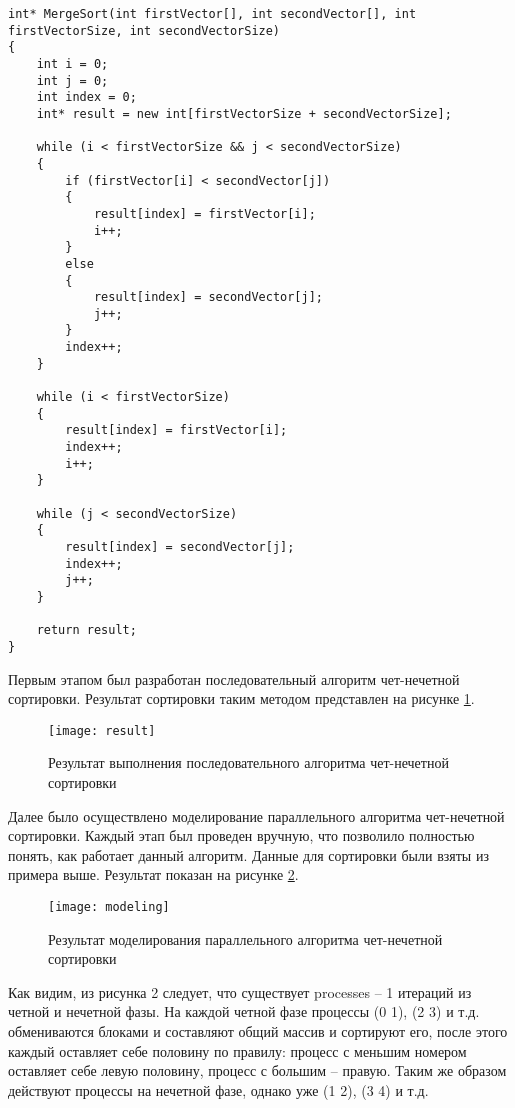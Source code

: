 \documentclass[a4paper,14pt]{extarticle}
\begin{document}
\begin{lstlisting}
int* MergeSort(int firstVector[], int secondVector[], int firstVectorSize, int secondVectorSize)
{
    int i = 0;
    int j = 0;
    int index = 0;
    int* result = new int[firstVectorSize + secondVectorSize];

    while (i < firstVectorSize && j < secondVectorSize) 
    {
        if (firstVector[i] < secondVector[j]) 
        {
            result[index] = firstVector[i];
            i++;
        }
        else 
        {
            result[index] = secondVector[j];
            j++;
        }
        index++;
    }

    while (i < firstVectorSize) 
    {
        result[index] = firstVector[i];
        index++;
        i++;
    }

    while (j < secondVectorSize) 
    {
        result[index] = secondVector[j];
        index++;
        j++;
    }

    return result;
}
\end{lstlisting}

Первым этапом был разработан последовательный алгоритм чет-нечетной сортировки.
Результат сортировки таким методом представлен на рисунке \ref{fig:result}.
\begin{figure}[H]
    \centering
    \texttt{[image: result]}
    \caption{Результат выполнения последовательного алгоритма чет-нечетной сортировки}
    \label{fig:result}
\end{figure}

Далее было осуществлено моделирование параллельного алгоритма чет-нечетной
сортировки. Каждый этап был проведен вручную, что позволило полностью понять,
как работает данный алгоритм. Данные для сортировки были взяты из примера выше.
Результат показан на рисунке \ref{fig:modeling}.
\begin{figure}[H]
    \centering
    \texttt{[image: modeling]}
    \caption{Результат моделирования параллельного алгоритма чет-нечетной сортировки}
    \label{fig:modeling}
\end{figure}

Как видим, из рисунка 2 следует, что существует processes – 1 итераций из четной
и нечетной фазы. На каждой четной фазе процессы (0 1), (2 3) и т.д. обмениваются
блоками и составляют общий массив и сортируют его, после этого каждый оставляет
себе половину по правилу: процесс с меньшим номером оставляет себе левую
половину, процесс с большим – правую. Таким же образом действуют процессы на
нечетной фазе, однако уже (1 2), (3 4) и т.д.
\end{document}
